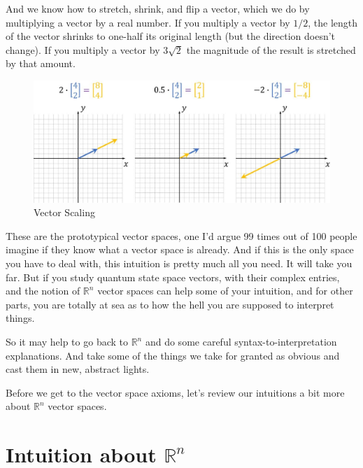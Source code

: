 \documentclass[
]{book}
\begin{document}
And we know how to stretch, shrink, and flip a vector, which we do by multiplying a vector by a real number. If you multiply a vector by \(1/2\), the length of the vector shrinks to one-half its original length (but the direction doesn't change). If you multiply a vector by \(3 \sqrt{2}\) the magnitude of the result is stretched by that amount.

\begin{figure}

{\centering \includegraphics[width=1\linewidth,height=1\textheight]{images/Vector-scaling} 

}

\caption{Vector Scaling}\label{fig:unnamed-chunk-2}
\end{figure}

These are the prototypical vector spaces, one I'd argue 99 times out of 100 people imagine if they know what a vector space is already. And if this is the only space you have to deal with, this intuition is pretty much all you need. It will take you far. But if you study quantum state space vectors, with their complex entries, and the notion of \(\mathbb{R}^n\) vector spaces can help some of your intuition, and for other parts, you are totally at sea as to how the hell you are supposed to interpret things.

So it may help to go back to \(\mathbb{R}^n\) and do some careful syntax-to-interpretation explanations. And take some of the things we take for granted as obvious and cast them in new, abstract lights.

Before we get to the vector space axioms, let's review our intuitions a bit more about \(\mathbb{R}^n\) vector spaces.

\hypertarget{intuition-about-mathbbrn}{%
\section{\texorpdfstring{Intuition about \(\mathbb{R}^n\)}{Intuition about \textbackslash mathbb\{R\}\^{}n}}\label{intuition-about-mathbbrn}}
\end{document}
